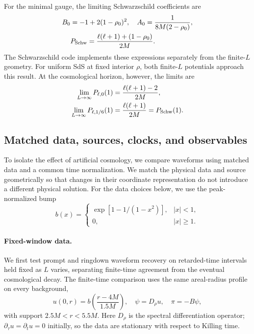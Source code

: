 \documentclass[
 aps,
 prd,
 reprint,
 superscriptaddress,
 nofootinbib,
 longbibliography
]{revtex4-2}
\begin{document}
For the minimal gauge, the limiting Schwarzschild coefficients are
\begin{align}
 B_0&=-1+2(1-\rho_0)^2, \quad A_0=\frac{1}{8M(2-\rho_0)},
 \label{eq:schwarz_coefficients}\\
 &P_{\rm Schw}=\frac{\ell(\ell+1)+(1-\rho_0)}{2M}.
 \label{eq:schwarz_potential}
\end{align}
The Schwarzschild code implements these expressions separately from the finite-$L$ geometry.
For uniform SdS at fixed interior $\rho$, both finite-$L$ potentials approach this result.  At the cosmological horizon, however, the limits are
\begin{align}
 \lim_{L\to\infty}P_{\ell,0}(1)
 &=\frac{\ell(\ell+1)-2}{2M},\notag\\
 \lim_{L\to\infty}P_{\ell,1/6}(1)
 &=\frac{\ell(\ell+1)}{2M}=P_{\rm Schw}(1).
 \label{eq:coupling_endpoint_limits}
\end{align}

\subsection{Matched data, sources, clocks, and observables}
\label{sec:protocol}
\label{sec:localized_source}

To isolate the effect of artificial cosmology, we compare waveforms using matched data and a common time normalization.  We match the physical data and source geometrically so that changes in their coordinate representation do not introduce a different physical solution. For the data choices below, we use the peak-normalized bump
\begin{equation}
 b(x)=
 \begin{cases}
 \exp[1-1/(1-x^2)],&|x|<1,\\
 0,&|x|\geq1.
 \end{cases}
 \label{eq:bump}
\end{equation}

\paragraph{Fixed-window data.}
We first test prompt and ringdown waveform recovery on retarded-time
intervals held fixed as $L$ varies, separating finite-time agreement from
the eventual cosmological decay.
The finite-time comparison uses the same areal-radius profile on every
background,
\begin{equation}
 u(0,r)=b\!\left(\frac{r-4M}{1.5M}\right),\quad
 \psi=D_\rho u,\quad \pi=-B\psi,
\label{eq:displacement_data}
\end{equation}
with support $2.5M<r<5.5M$.  Here $D_\rho$ is the spectral differentiation
operator; $\partial_\tau u=\partial_tu=0$ initially, so the data are stationary with respect to Killing time.
\end{document}
